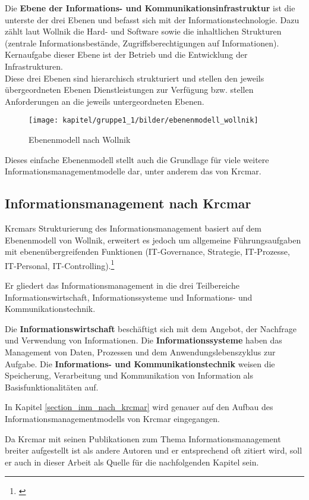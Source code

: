 Die \textbf{Ebene der Informations- und Kommunikationsinfrastruktur} ist die unterste der drei Ebenen 
und befasst sich mit der Informationstechnologie. 
Dazu zählt laut Wollnik die Hard- und Software sowie die inhaltlichen Strukturen (zentrale Informationsbestände, Zugriffsberechtigungen auf Informationen). Kernaufgabe dieser Ebene ist der Betrieb und die Entwicklung der Infrastrukturen.\\

Diese drei Ebenen sind hierarchisch strukturiert und stellen den jeweils übergeordneten Ebenen Dienstleistungen zur Verfügung bzw. stellen Anforderungen an die jeweils untergeordneten Ebenen. 

\begin{figure}[h!]
	\centering
	\texttt{[image: kapitel/gruppe1\_1/bilder/ebenenmodell\_wollnik]}
	\caption{Ebenenmodell nach Wollnik}
	\label{fig_ebenenmodell_wollnik}
\end{figure}

Dieses einfache Ebenenmodell stellt auch die Grundlage für viele weitere Informationsmanagementmodelle dar, unter anderem das von Krcmar.

\subsection{Informationsmanagement nach Krcmar}
Krcmars Strukturierung des Informationsmanagement basiert auf dem Ebenenmodell von Wollnik, erweitert es jedoch um allgemeine Führungsaufgaben mit ebenenübergreifenden Funktionen (IT-Governance, Strategie, IT-Prozesse, IT-Personal, IT-Controlling).\footnote{\cite{krcmar_informationsmanagement_2015}}

Er gliedert das Informationsmanagement in die drei Teilbereiche Informationswirtschaft, Informationssysteme und Informations- und Kommunikationstechnik.

Die \textbf{Informationswirtschaft} beschäftigt sich mit dem Angebot, der Nachfrage und Verwendung von Informationen.
Die \textbf{Informationssysteme} haben das Management von Daten, Prozessen und dem Anwendungslebenszyklus zur Aufgabe.
Die \textbf{Informations- und Kommunikationstechnik} weisen die Speicherung, Verarbeitung und Kommunikation von Information als Basisfunktionalitäten auf.

In Kapitel \ref{section_inm_nach_krcmar} wird genauer auf den Aufbau des Informationsmanagementmodells von Krcmar eingegangen.

Da Krcmar mit seinen Publikationen zum Thema Informationsmanagement breiter aufgestellt ist als andere Autoren und er entsprechend oft zitiert wird, soll er auch in dieser Arbeit als Quelle für die nachfolgenden Kapitel sein. 

